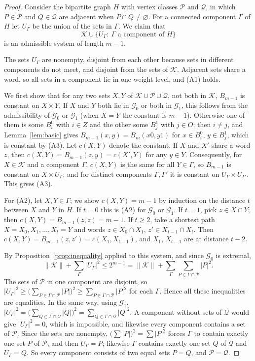\documentclass[screen]{aomart}
\theoremstyle{definition}
\theoremstyle{remark}
\numberwithin{equation}{section}
\newcommand{\cG}{\mathcal{G}}
\newcommand{\cK}{\mathcal{K}}
\newcommand{\cP}{\mathcal{P}}
\newcommand{\cQ}{\mathcal{Q}}
\begin{document}
\begin{proof}
Consider the bipartite graph $H$ with vertex classes $\cP$ and $\cQ$, in which $P\in\cP$ and $Q\in\cQ$ are adjacent when $P\cap Q\ne\varnothing$. For a connected component $\Gamma$ of $H$ let $U_\Gamma$ be the union of the sets in $\Gamma$. We claim that
\[
\cK\cup\{U_\Gamma:\ \Gamma\text{ a component of }H\}
\]
is an admissible system of length $m-1$.

The sets $U_\Gamma$ are nonempty, disjoint from each other because sets in different components do not meet, and disjoint from the sets of $\cK$. Adjacent sets share a word, so all sets in a component lie in one weight level, and (A1) holds.

We first show that for any two sets $X,Y$ of $\cK\cup\cP\cup\cQ$, not both in $\cK$, $B_{m-1}$ is constant on $X\times Y$. If $X$ and $Y$ both lie in $\cG_0$ or both in $\cG_1$, this follows from the admissibility of $\cG_0$ or $\cG_1$ (when $X=Y$ the constant is $m-1$). Otherwise one of them is some $B_i^0$ with $i\in Z$ and the other some $B_j^1$ with $j\in O$; then $i\ne j$, and Lemma~\ref{lem:basic} gives $B_{m-1}(x,y)=B_m(x0,y1)$ for $x\in B_i^0$, $y\in B_j^1$, which is constant by (A3). Let $c(X,Y)$ denote the constant. If $X$ and $X'$ share a word $z$, then $c(X,Y)=B_{m-1}(z,y)=c(X',Y)$ for any $y\in Y$. Consequently, for $X\in\cK$ and a component $\Gamma$, $c(X,Y)$ is the same for all $Y\in\Gamma$, so $B_{m-1}$ is constant on $X\times U_\Gamma$; and for distinct components $\Gamma,\Gamma'$ it is constant on $U_\Gamma\times U_{\Gamma'}$. This gives (A3).

For (A2), let $X,Y\in\Gamma$; we show $c(X,Y)=m-1$ by induction on the distance $t$ between $X$ and $Y$ in $H$. If $t=0$ this is (A2) for $\cG_0$ or $\cG_1$. If $t=1$, pick $z\in X\cap Y$; then $c(X,Y)=B_{m-1}(z,z)=m-1$. If $t\ge2$, take a shortest path $X=X_0,X_1,\dots,X_t=Y$ and words $z\in X_0\cap X_1$, $z'\in X_{t-1}\cap X_t$. Then $c(X,Y)=B_{m-1}(z,z')=c(X_1,X_{t-1})$, and $X_1$, $X_{t-1}$ are at distance $t-2$.

By Proposition~\ref{prop:inequality} applied to this system, and since $\cG_0$ is extremal,
\[
\|\cK\|+\sum_\Gamma|U_\Gamma|^2\le 2^{m-1}=\|\cK\|+\sum_\Gamma\sum_{P\in\Gamma\cap\cP}|P|^2 .
\]
The sets of $\cP$ in one component are disjoint, so $|U_\Gamma|^2\ge\bigl(\sum_{P\in\Gamma\cap\cP}|P|\bigr)^2\ge\sum_{P\in\Gamma\cap\cP}|P|^2$ for each $\Gamma$. Hence all these inequalities are equalities. In the same way, using $\cG_1$, $|U_\Gamma|^2=\bigl(\sum_{Q\in\Gamma\cap\cQ}|Q|\bigr)^2=\sum_{Q\in\Gamma\cap\cQ}|Q|^2$. A component without sets of $\cQ$ would give $|U_\Gamma|^2=0$, which is impossible, and likewise every component contains a set of $\cP$. Since the sets are nonempty, $\bigl(\sum|P|\bigr)^2=\sum|P|^2$ forces $\Gamma$ to contain exactly one set $P$ of $\cP$, and then $U_\Gamma=P$; likewise $\Gamma$ contains exactly one set $Q$ of $\cQ$ and $U_\Gamma=Q$. So every component consists of two equal sets $P=Q$, and $\cP=\cQ$.
\end{proof}
\end{document}

